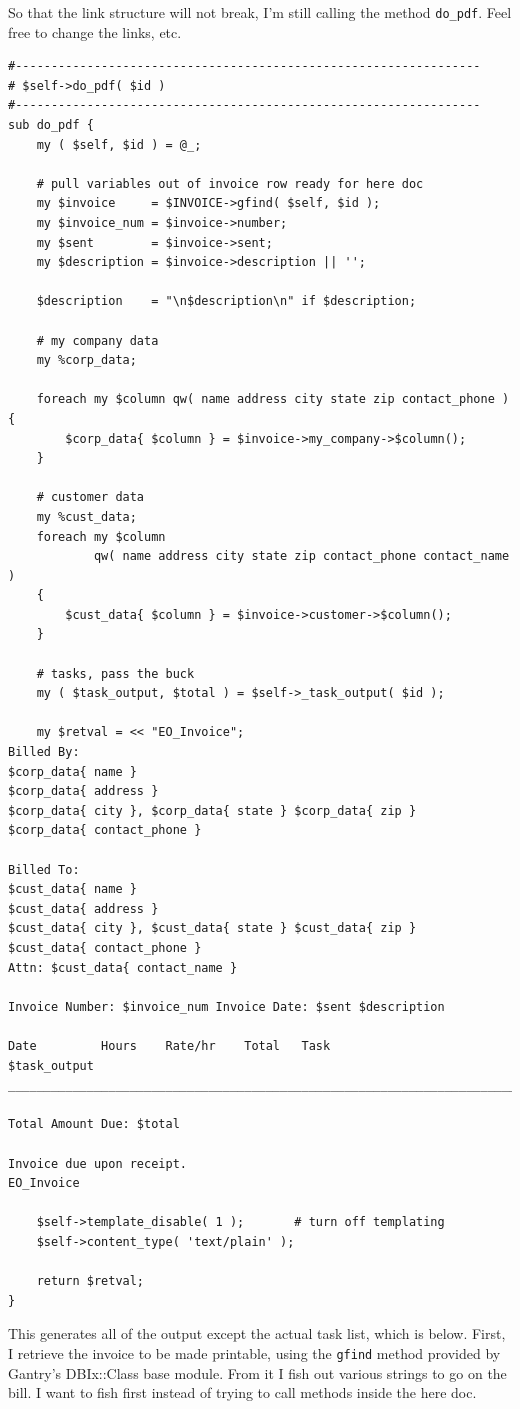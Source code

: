 So that the link structure will not break, I'm still calling the method
\verb+do_pdf+.  Feel free to change the links, etc.

\begin{verbatim}
#-----------------------------------------------------------------
# $self->do_pdf( $id )
#-----------------------------------------------------------------
sub do_pdf {
    my ( $self, $id ) = @_;

    # pull variables out of invoice row ready for here doc
    my $invoice     = $INVOICE->gfind( $self, $id );
    my $invoice_num = $invoice->number;
    my $sent        = $invoice->sent;
    my $description = $invoice->description || '';

    $description    = "\n$description\n" if $description;

    # my company data
    my %corp_data;

    foreach my $column qw( name address city state zip contact_phone ) {
        $corp_data{ $column } = $invoice->my_company->$column();
    }

    # customer data
    my %cust_data;
    foreach my $column
            qw( name address city state zip contact_phone contact_name )
    {
        $cust_data{ $column } = $invoice->customer->$column();
    }

    # tasks, pass the buck
    my ( $task_output, $total ) = $self->_task_output( $id );

    my $retval = << "EO_Invoice";
Billed By:
$corp_data{ name }
$corp_data{ address }
$corp_data{ city }, $corp_data{ state } $corp_data{ zip }
$corp_data{ contact_phone }

Billed To:
$cust_data{ name }
$cust_data{ address }
$cust_data{ city }, $cust_data{ state } $cust_data{ zip }
$cust_data{ contact_phone }
Attn: $cust_data{ contact_name }

Invoice Number: $invoice_num Invoice Date: $sent $description

Date         Hours    Rate/hr    Total   Task
$task_output
_______________________________________________________________________

Total Amount Due: $total

Invoice due upon receipt.
EO_Invoice

    $self->template_disable( 1 ); 		# turn off templating
    $self->content_type( 'text/plain' );

    return $retval;
}
\end{verbatim}

This generates all of the output except the actual task list, which is below.
First, I retrieve the invoice to be made printable, using the \verb+gfind+
method provided by Gantry's DBIx::Class base module.  From it I fish out
various strings to go on the bill.  I want to fish first instead of trying
to call methods inside the here doc.

